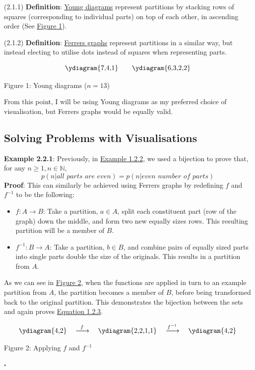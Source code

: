 \documentclass{article}
\newcommand{\separate}[1] {\vspace{#1 pt}\noindent}
\newcommand{\N}{\mathbb{N}}
\newcommand{\definition}[2]{(#1) \textbf{Definition}: #2}
\newcommand{\proof}[1]{\textbf{Proof}: #1 \begin{flushright}\(\square\)\end{flushright}}
\begin{document}
\definition{2.1.1}{\underline{Young diagrams} represent partitions by stacking rows of squares (corresponding to individual parts) on top of each other, in ascending order (See \hyperref[fig:1]{Figure 1}).}

\separate{5}\definition{2.1.2}{\underline{Ferrers graphs} represent partitions in a similar way, but instead electing to utilise dots instead of squares when representing parts.}

\[
    \vcenter{\hbox{\ydiagram{7,4,1}}} \quad\quad
    \vcenter{\hbox{\ydiagram{6,3,2,2}}}
\]\label{fig:1}
{\centering Figure 1: Young diagrams (\(n=13\)) \par}

\separate{5}From this point, I will be using Young diagrams as my preferred choice of visualisation, but Ferrers graphs would be equally valid.

\subsection{Solving Problems with Visualisations}

\textbf{Example 2.2.1}: Previously, in \hyperref[ex:1.2.2]{Example 1.2.2}, we used a bijection to prove that, for any \(n \geq 1, n \in \N,\)
\begin{equation}\tag{1.2.3 \small(Repeated)}
    p(n | \textit{all parts are even}) = p(n | \textit{even number of parts})
\end{equation}
\proof{This can similarly be achieved using Ferrers graphs by redefining \(f\) and \(f^{-1}\) to be the following:
\begin{itemize}
    \item \(f:A \rightarrow B\): Take a partition, \(a \in A\), split each constituent part (row of the graph) down the middle, and form two new equally sizes rows. This resulting partition will be a member of \(B\). 
    \item \(f^{-1}:B \rightarrow A\): Take a partition, \(b \in B\), and combine pairs of equally sized parts into single parts double the size of the originals. This results in a partition from \(A\).
\end{itemize}
As we can see in \hyperref[fig:2]{Figure 2}, when the functions are applied in turn to an example partition from \(A\), the partition becomes a member of \(B\), before being transformed back to the original partition. This demonstrates the bijection between the sets and again proves \hyperref[equ:1.2.3]{Equation 1.2.3}.

\[
    \vcenter{\hbox{\ydiagram{4,2}}} 
    \quad\xrightarrow{\;\;f\;\;}\quad
    \vcenter{\hbox{\ydiagram{2,2,1,1}}} 
    \quad\xrightarrow{f^{-1}}\quad
    \vcenter{\hbox{\ydiagram{4,2}}}
\]\label{fig:2}
{\centering Figure 2: Applying \(f\) and \(f^{-1}\) \par}}
\end{document}
